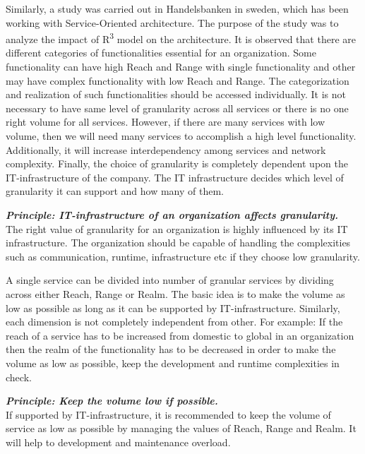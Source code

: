 Similarly, a study was carried out in Handelsbanken in sweden, which has been working with Service-Oriented architecture. The purpose of the study was to analyze the impact of R\textsuperscript{3} model on the architecture. It is observed that there are different categories of functionalities essential for an organization. Some functionality can have high Reach and Range with single functionality and other may have complex functionality with low Reach and Range. The categorization and realization of such functionalities should be accessed individually. It is not necessary to have same level of granularity across all services or there is no one right volume for all services. However, if there are many services with low volume, then we will need many services to accomplish a high level functionality. Additionally, it will increase interdependency among services and network complexity. Finally, the choice of granularity is completely dependent upon the IT-infrastructure of the company. The IT infrastructure decides which level of granularity it can support and how many of them. \cite{Pierre-Reldin:2007aa}


\begin{framed}
\textbf{\textit{Principle: IT-infrastructure of an organization affects granularity.}}
\\
The right value of granularity for an organization is highly influenced by its IT infrastructure. The organization should be capable of handling the complexities such as communication, runtime, infrastructure etc if they choose low granularity. \cite{Pierre-Reldin:2007aa}
\end{framed}

A single service can be divided into number of granular services by dividing across either Reach, Range or Realm. The basic idea is to make the volume as low as possible as long as it can be supported by IT-infrastructure. Similarly, each dimension is not completely independent from other. For example: If the reach of a service has to be increased from domestic to global in an organization then the realm of the functionality has to be decreased in order to make the volume as low as possible, keep the development and runtime complexities in check. \cite{Pierre-Reldin:2007aa}

\begin{framed}
\textbf{\textit{Principle: Keep the volume low if possible.}}
\\
If supported by IT-infrastructure, it is recommended to keep the volume of service as low as possible by managing the values of Reach, Range and Realm. It will help to development and maintenance overload. \cite{Pierre-Reldin:2007aa}
\end{framed}


